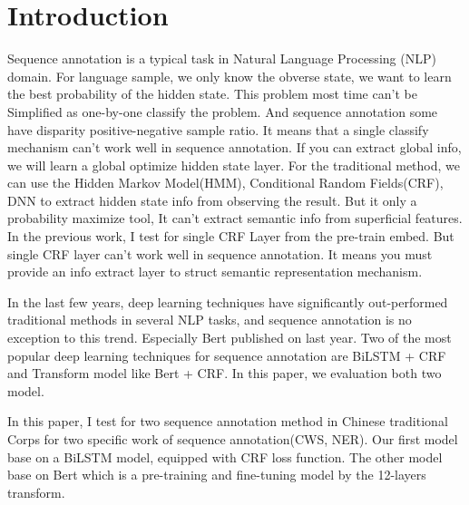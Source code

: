 \section{Introduction}

Sequence annotation is a typical task in Natural Language Processing (NLP) domain.
For language sample, we only know the obverse state, we want to learn the best probability of the hidden state.
This problem most time can't be Simplified as one-by-one classify the problem.
And sequence annotation some have disparity positive-negative sample ratio.
It means that a single classify mechanism can't work well in sequence annotation.
If you can extract global info, we will learn a global optimize hidden state layer.
For the traditional method, we can use the Hidden Markov Model(HMM), Conditional Random Fields(CRF), DNN to extract hidden state info from observing the result.
But it only a probability maximize tool, It can't extract semantic info from superficial features. In the previous work, I test for single CRF Layer from the pre-train embed. But single CRF layer can't work well in sequence annotation. It means you must provide an info extract layer to struct semantic representation mechanism.


In the last few years, deep learning techniques have significantly out-performed traditional methods in several NLP tasks,  and sequence annotation is no exception to this trend.
Especially Bert published on last year. Two of the most popular deep learning techniques for sequence annotation are BiLSTM + CRF and Transform model like Bert + CRF.
In this paper, we evaluation both two model.

In this paper, I test for two sequence annotation method in Chinese traditional Corps for two specific work of sequence annotation(CWS, NER). Our first model base on a BiLSTM model, equipped with CRF loss function.
The other model base on Bert which is a pre-training and fine-tuning model by the 12-layers transform.
